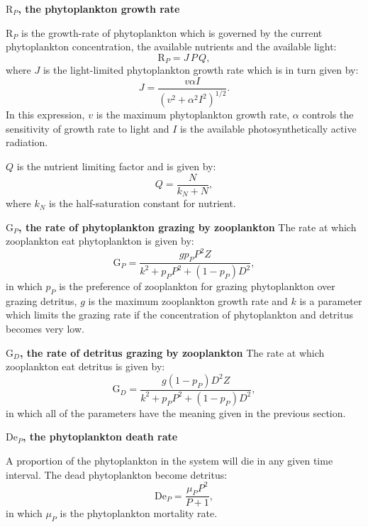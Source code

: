 \textbf{$\mathrm{R}_P$, the phytoplankton growth rate}\label{sec:R_P}

$\mathrm{R}_P$ is the growth-rate of phytoplankton which is governed by the
current phytoplankton concentration, the available nutrients and the
available light:
\begin{equation}
  \mathrm{R}_P=J\,P\,Q,
\end{equation}
where $J$ is the light-limited phytoplankton growth rate which is in turn given
by:
\begin{equation}
  J=\frac{v\alpha I}{(v^2+\alpha^2 I^2)^{1/2}}.
\end{equation}
In this expression, $v$ is the maximum phytoplankton growth rate, $\alpha$
controls the sensitivity of growth rate to light and $I$ is the available
photosynthetically active radiation.

$Q$ is the nutrient limiting factor and is given by:
\begin{equation}
  Q=\frac{N}{k_N+N},
\end{equation}
where $k_N$ is the half-saturation constant for nutrient.

\textbf{$\mathrm{G}_P$, the rate of phytoplankton grazing by zooplankton}\label{sec:G_P}
The rate at which zooplankton eat phytoplankton is given by:
\begin{equation}
  \mathrm{G}_P=\frac{g p_P P^2 Z}{k^2 + p_P P^2 + (1-p_P) D^2},
\end{equation}
in which $p_P$ is the preference of zooplankton for grazing phytoplankton
over grazing detritus, $g$ is the maximum zooplankton growth rate and $k$ is
a parameter which limits the grazing rate if the concentration of
phytoplankton and detritus becomes very low.

\textbf{$\mathrm{G}_D$, the rate of detritus grazing by zooplankton}\label{sec:G_D}
The rate at which zooplankton eat detritus is given by:
\begin{equation}
  \mathrm{G}_D=\frac{g (1-p_P) D^2 Z}{k^2 + p_P P^2 + (1-p_P) D^2},
\end{equation}
in which all of the parameters have the meaning given in the previous
section.

\textbf{$\mathrm{De}_P$, the phytoplankton death rate}\label{sec:De_P}

A proportion of the phytoplankton in the system will die in any given time
interval. The dead phytoplankton become detritus:
\begin{equation}
  \mathrm{De}_P=\frac{\mu_P P^2}{P+1},
\end{equation}
in which $\mu_P$ is the phytoplankton mortality rate.

